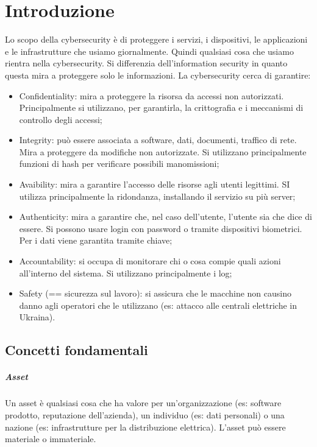 \chapter{Introduzione}
\label{chapter1}

Lo scopo della cybersecurity è di proteggere i servizi, i dispositivi, le applicazioni e le infrastrutture che usiamo giornalmente. Quindi qualsiasi cosa che usiamo rientra nella cybersecurity. Si differenzia dell'information security in quanto questa mira a proteggere solo le informazioni. La cybersecurity cerca di garantire:
\begin{itemize}
    \item Confidentiality: mira a proteggere la risorsa da accessi non autorizzati. Principalmente si utilizzano, per garantirla, la crittografia e i meccanismi di controllo degli accessi;
    \item Integrity: può essere associata a software, dati, documenti, traffico di rete. Mira a proteggere da modifiche non autorizzate. Si utilizzano principalmente funzioni di hash per verificare possibili manomissioni;
    \item Avaibility: mira a garantire l'accesso delle risorse agli utenti legittimi. SI utilizza principalmente la ridondanza, installando il servizio su più server;
    \item Authenticity: mira a garantire che, nel caso dell'utente, l'utente sia che dice di essere. Si possono usare login con password o tramite dispositivi biometrici. Per i dati viene garantita tramite chiave;
    \item Accountability: si occupa di monitorare chi o cosa compie quali azioni all'interno del sistema. Si utilizzano principalmente i log;
    \item Safety (== sicurezza sul lavoro): si assicura che le macchine non causino danno agli operatori che le utilizzano (es: attacco alle centrali elettriche in Ukraina). 

\end{itemize}

\section{Concetti fondamentali}

\paragraph*{Asset} Un asset è qualsiasi cosa che ha valore per un'organizzazione (es: software prodotto, reputazione dell'azienda), un individuo (es: dati personali) o una nazione (es: infrastrutture per la distribuzione elettrica). L'asset può essere materiale o immateriale.

